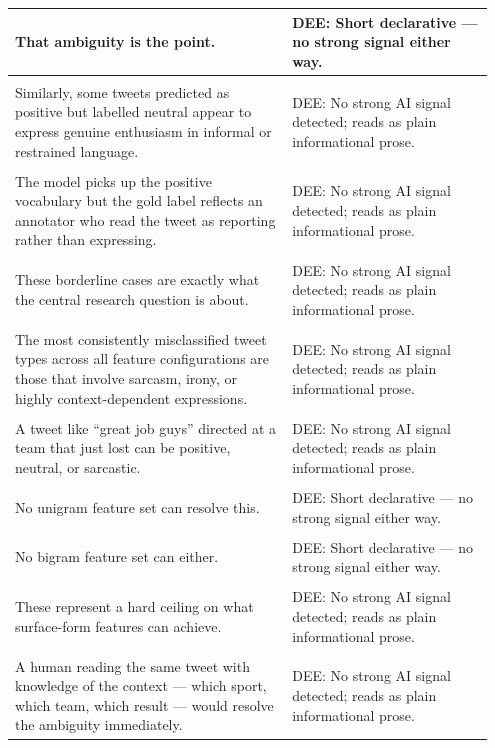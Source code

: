 \documentclass[11pt]{article}
\begin{document}
\begin{longtable}{|p{0.55\linewidth}|p{0.40\linewidth}|}
\hline
That ambiguity is the point. & DEE: Short declarative --- no strong signal either way. \\[2pt]
\hline
\rule{0pt}{3.5cm} & \\
\hline
Similarly, some tweets predicted as positive but labelled neutral appear to express genuine enthusiasm in informal or restrained language. & DEE: No strong AI signal detected; reads as plain informational prose. \\[2pt]
\hline
\rule{0pt}{3.5cm} & \\
\hline
The model picks up the positive vocabulary but the gold label reflects an annotator who read the tweet as reporting rather than expressing. & DEE: No strong AI signal detected; reads as plain informational prose. \\[2pt]
\hline
\rule{0pt}{3.5cm} & \\
\hline
These borderline cases are exactly what the central research question is about. & DEE: No strong AI signal detected; reads as plain informational prose. \\[2pt]
\hline
\rule{0pt}{3.5cm} & \\
\hline
The most consistently misclassified tweet types across all feature configurations are those that involve sarcasm, irony, or highly context-dependent expressions. & DEE: No strong AI signal detected; reads as plain informational prose. \\[2pt]
\hline
\rule{0pt}{3.5cm} & \\
\hline
A tweet like ``great job guys'' directed at a team that just lost can be positive, neutral, or sarcastic. & DEE: No strong AI signal detected; reads as plain informational prose. \\[2pt]
\hline
\rule{0pt}{3.5cm} & \\
\hline
No unigram feature set can resolve this. & DEE: Short declarative --- no strong signal either way. \\[2pt]
\hline
\rule{0pt}{3.5cm} & \\
\hline
No bigram feature set can either. & DEE: Short declarative --- no strong signal either way. \\[2pt]
\hline
\rule{0pt}{3.5cm} & \\
\hline
These represent a hard ceiling on what surface-form features can achieve. & DEE: No strong AI signal detected; reads as plain informational prose. \\[2pt]
\hline
\rule{0pt}{3.5cm} & \\
\hline
A human reading the same tweet with knowledge of the context --- which sport, which team, which result --- would resolve the ambiguity immediately. & DEE: No strong AI signal detected; reads as plain informational prose. \\[2pt]

\end{longtable}
\end{document}
